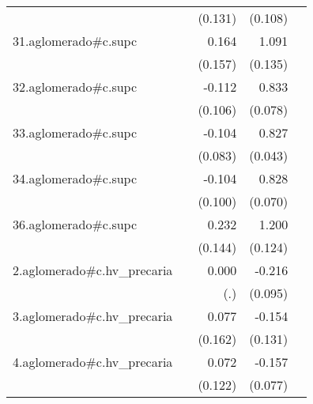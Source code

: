{\begin{longtable}{l*{4}{D{.}{.}{-1}}}
            &                     &     (0.131)         &     (0.108)         &                     \\
\addlinespace
31.aglomerado#c.supc&                     &       0.164         &       1.091\sym{***}&                     \\
            &                     &     (0.157)         &     (0.135)         &                     \\
\addlinespace
32.aglomerado#c.supc&                     &      -0.112         &       0.833\sym{***}&                     \\
            &                     &     (0.106)         &     (0.078)         &                     \\
\addlinespace
33.aglomerado#c.supc&                     &      -0.104         &       0.827\sym{***}&                     \\
            &                     &     (0.083)         &     (0.043)         &                     \\
\addlinespace
34.aglomerado#c.supc&                     &      -0.104         &       0.828\sym{***}&                     \\
            &                     &     (0.100)         &     (0.070)         &                     \\
\addlinespace
36.aglomerado#c.supc&                     &       0.232         &       1.200\sym{***}&                     \\
            &                     &     (0.144)         &     (0.124)         &                     \\
\addlinespace
2.aglomerado#c.hv\_precaria&                     &       0.000         &      -0.216\sym{*}  &                     \\
            &                     &         (.)         &     (0.095)         &                     \\
\addlinespace
3.aglomerado#c.hv\_precaria&                     &       0.077         &      -0.154         &                     \\
            &                     &     (0.162)         &     (0.131)         &                     \\
\addlinespace
4.aglomerado#c.hv\_precaria&                     &       0.072         &      -0.157\sym{*}  &                     \\
            &                     &     (0.122)         &     (0.077)         &                     \\

\end{longtable}}
